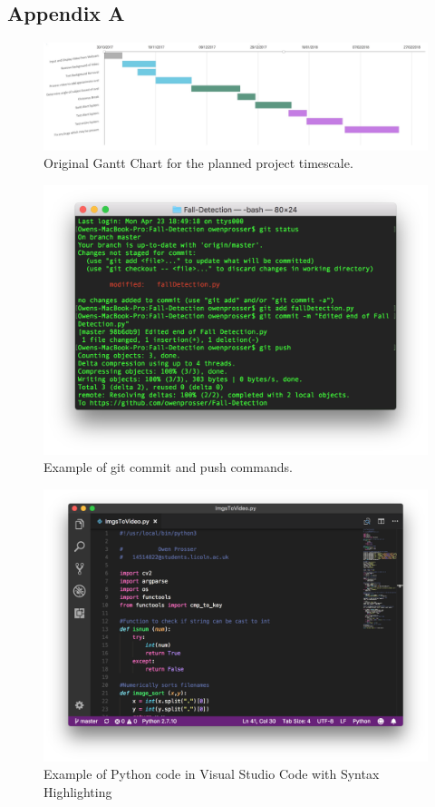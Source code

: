 \documentclass[11pt,a4paper]{report}
\begin{document}
\subsection{Appendix A}

\begin{figure}[H]
 \centering
 \includegraphics[scale = 0.33]{Original_gantt_chart.png}
 \caption{Original Gantt Chart for the planned project timescale.}
 \label{fig:OriginalGantt}
\end{figure}

\begin{figure}[H]
 \centering
 \includegraphics[scale = 0.55]{gitpush.png}
 \caption{Example of git commit and push commands.}
 \label{fig:GitCommitPush}
\end{figure}

\begin{figure}[H]
 \centering
 \includegraphics[scale = 0.4]{VSCode.png}
 \caption{Example of Python code in Visual Studio Code with Syntax Highlighting}
 \label{fig:VSCode}
\end{figure}
\end{document}
